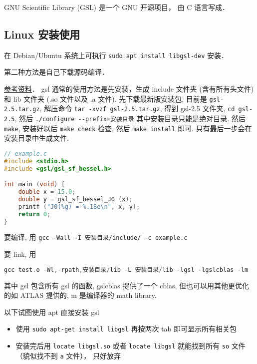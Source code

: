 
\begin{issues}
\issueDraft
\issueMissDepend
\end{issues}

GNU Scientific Library (GSL) 是一个 GNU 开源项目， 由 C 语言写成．

\subsection{Linux 安装使用}
在 Debian/Ubuntu 系统上可执行 \verb|sudo apt install libgsl-dev| 安装．

第二种方法是自己下载源码编译．

\href{https://coral.ise.lehigh.edu/jild13/2016/07/11/hello/}{参考资料}． gsl 通常的使用方法是先安装，生成 include 文件夹 (含有所有头文件) 和 lib 文件夹 (.so 文件以及 .a 文件). 先下载最新版安装包, 目前是 \verb`gsl-2.5.tar.gz`, 解压命令 \verb`tar -xvzf gsl-2.5.tar.gz`, 得到 gsl-2.5 文件夹, \verb`cd gsl-2.5`, 然后 \verb`./configure --prefix=安装目录` 其中安装目录只能是绝对目录. 然后 \verb`make`, 安装好以后 \verb`make check` 检查, 然后 \verb`make install` 即可. 只有最后一步会在安装目录中生成文件.

\begin{lstlisting}[language=cpp]
// example.c
#include <stdio.h>
#include <gsl/gsl_sf_bessel.h>

int main (void) {
    double x = 15.0;
    double y = gsl_sf_bessel_J0 (x);
    printf ("J0(%g) = %.18e\n", x, y);
    return 0;
}
\end{lstlisting}

要编译, 用 \verb|gcc -Wall -I 安装目录/include/ -c example.c|

要 link, 用
\begin{lstlisting}[language=cpp]
gcc test.o -Wl,-rpath,安装目录/lib -L 安装目录/lib -lgsl -lgslcblas -lm
\end{lstlisting}
其中 gsl 包含所有 gsl 的函数, gslcblas 提供了一个 cblas, 但也可以用其他更优化的如 ATLAS 提供的, m 是编译器的 math library.

以下试图使用 apt 直接安装 gsl
\begin{itemize}
\item 使用 \verb`sudo apt-get install libgsl` 再按两次 tab 即可显示所有相关包
\item 安装完后用 \verb`locate libgsl.so` 或者 \verb`locate libgsl` 就能找到所有 \verb`so` 文件（貌似找不到 \verb`a` 文件）， 只好放弃
\end{itemize}

